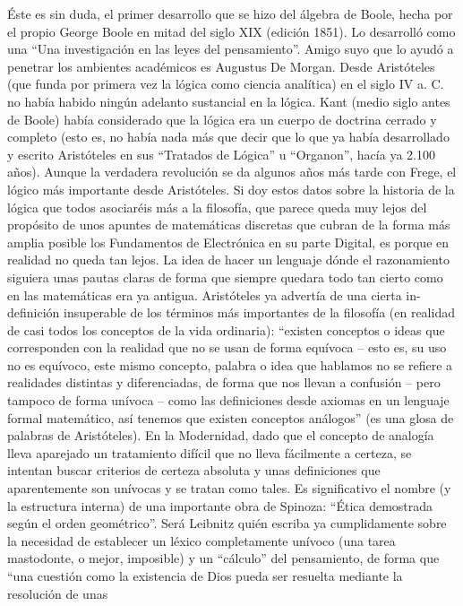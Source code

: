 \documentclass[final,12pt,a4paper,twoside,fleqn]{extbook}
\theoremstyle{definition}
\theoremstyle{remark}
\begin{document}
	Éste es sin duda, el primer desarrollo que se hizo del álgebra de Boole,
hecha por el propio George Boole en mitad del siglo XIX (edición 1851). Lo
desarrolló como una “Una investigación en las leyes del pensamiento”. Amigo
suyo que lo ayudó a penetrar los ambientes académicos es Augustus De Morgan.
Desde Aristóteles (que funda por primera vez la lógica como ciencia
analítica) en el siglo IV a. C. no había habido ningún adelanto sustancial en
la lógica. Kant (medio siglo antes de Boole) había considerado que la lógica
era un cuerpo de doctrina cerrado y completo (esto es, no había nada más que
decir que lo que ya había desarrollado y escrito Aristóteles en sus
“Tratados de Lógica” u “Organon”, hacía ya 2.100 años). Aunque la verdadera
revolución se da algunos años más tarde con Frege, el lógico más importante
desde Aristóteles. Si doy estos datos sobre la historia de la lógica que
todos asociaréis más a la filosofía, que parece queda muy lejos del propósito
de unos apuntes de matemáticas discretas que cubran de la forma más amplia
posible los Fundamentos de Electrónica en su parte Digital, es porque en
realidad no queda tan lejos. La idea de hacer un lenguaje dónde el
razonamiento siguiera unas pautas claras de forma que siempre quedara todo
tan cierto como en las matemáticas era ya antigua. Aristóteles ya advertía de
una cierta in-definición insuperable de los términos más importantes de la
filosofía (en realidad de casi todos los conceptos de la vida ordinaria):
“existen conceptos o ideas que corresponden con la realidad que no se usan de
forma equívoca – esto es, su uso no es equívoco, este mismo concepto, palabra
o idea que hablamos no se refiere a realidades distintas y diferenciadas, de
forma que nos llevan a confusión – pero tampoco de forma unívoca – como las
definiciones desde axiomas en un lenguaje formal matemático, así tenemos que
existen conceptos análogos” (es una glosa de palabras de Aristóteles). En la
Modernidad, dado que el concepto de analogía lleva aparejado un tratamiento
difícil que no lleva fácilmente a certeza, se intentan buscar criterios de
certeza absoluta y unas definiciones que aparentemente son unívocas y se
tratan como tales. Es significativo el nombre (y la estructura interna) de
una importante obra de Spinoza: “Ética demostrada según el orden
geométrico”. Será Leibnitz quién escriba ya cumplidamente sobre la necesidad
de establecer un léxico completamente unívoco (una tarea mastodonte, o mejor,
imposible) y un “cálculo” del pensamiento, de forma que “una cuestión como la
existencia de Dios pueda ser resuelta mediante la resolución de unas
\end{document}
